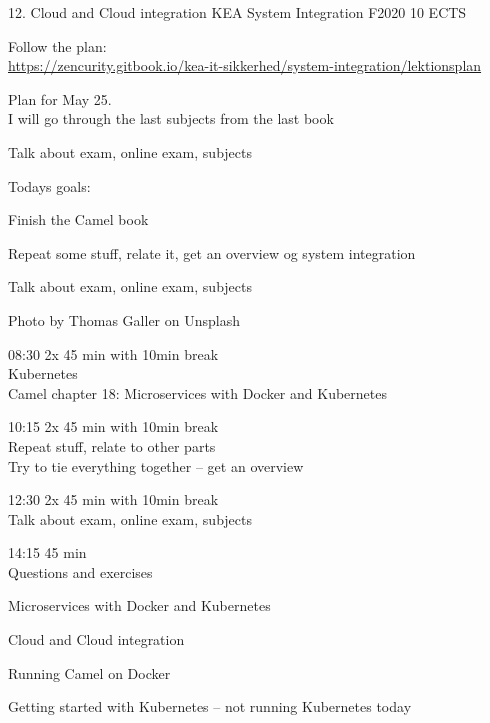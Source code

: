 \documentclass[Screen16to9,17pt]{foils}
\begin{document}
\mytitlepage
{12. Cloud and Cloud integration}
{KEA System Integration F2020 10 ECTS}




\begin{list2}
\item Follow the plan:\\
\url{https://zencurity.gitbook.io/kea-it-sikkerhed/system-integration/lektionsplan}
\item Plan for May 25.\\
I will go through the last subjects from the last book
\item Talk about exam, online exam, subjects
\end{list2}



Todays goals:
\begin{list2}
\item Finish the Camel book
\item Repeat some stuff, relate it, get an overview og system integration
\item Talk about exam, online exam, subjects
\end{list2}

Photo by Thomas Galler on Unsplash


\begin{list2}
\item 08:30 2x 45 min with 10min break\\
Kubernetes\\
Camel chapter 18: Microservices with Docker and Kubernetes
\item 10:15 2x 45 min with 10min break\\
Repeat stuff, relate to other parts\\
Try to tie everything together -- get an overview
\item 12:30 2x 45 min with 10min break \\
Talk about exam, online exam, subjects
\item 14:15 45 min\\
Questions and exercises
\end{list2}






\begin{list2}
\item Microservices with Docker and Kubernetes
\item Cloud and Cloud integration
\item Running Camel on Docker
\item Getting started with Kubernetes -- not running Kubernetes today
\end{list2}
\end{document}
